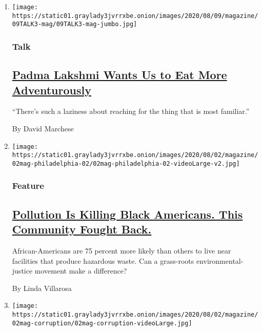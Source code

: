 \begin{enumerate}
\def\labelenumi{\arabic{enumi}.}
\item
  \texttt{[image: https://static01.graylady3jvrrxbe.onion/images/2020/08/09/magazine/09TALK3-mag/09TALK3-mag-jumbo.jpg]}

  \hypertarget{talk}{%
  \subsubsection{Talk}\label{talk}}

  \hypertarget{padma-lakshmi-wants-us-to-eat-more-adventurously}{%
  \subsection{\texorpdfstring{\href{/interactive/2020/08/03/magazine/padma-lakshmi-interview.html}{Padma
  Lakshmi Wants Us to Eat More
  Adventurously}}{Padma Lakshmi Wants Us to Eat More Adventurously}}\label{padma-lakshmi-wants-us-to-eat-more-adventurously}}

  ``There's such a laziness about reaching for the thing that is most
  familiar.''

  By David Marchese
\item
  \texttt{[image: https://static01.graylady3jvrrxbe.onion/images/2020/08/02/magazine/02mag-philadelphia-02/02mag-philadelphia-02-videoLarge-v2.jpg]}

  \hypertarget{feature}{%
  \subsubsection{Feature}\label{feature}}

  \hypertarget{pollution-is-killing-black-americans-this-community-fought-back}{%
  \subsection{\texorpdfstring{\href{/2020/07/28/magazine/pollution-philadelphia-black-americans.html}{Pollution
  Is Killing Black Americans. This Community Fought
  Back.}}{Pollution Is Killing Black Americans. This Community Fought Back.}}\label{pollution-is-killing-black-americans-this-community-fought-back}}

  African-Americans are 75 percent more likely than others to live near
  facilities that produce hazardous waste. Can a grass-roots
  environmental-justice movement make a difference?

  By Linda Villarosa
\item
  \texttt{[image: https://static01.graylady3jvrrxbe.onion/images/2020/08/02/magazine/02mag-corruption/02mag-corruption-videoLarge.jpg]}


\end{enumerate}
